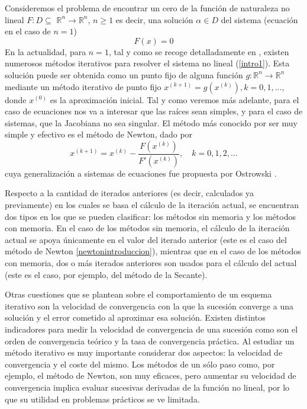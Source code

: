 Consideremos el problema de encontrar un cero de la función de naturaleza no lineal $\displaystyle F : D \subseteq$ $\mathbb{R}^n \to \mathbb{R}^n$, $\displaystyle n\geq 1$ es decir,
una solución $\alpha \in D$ del sistema (ecuación en el caso de $n=1$)
\begin{equation}\label{intro1}
F(x) = 0
\end{equation}
En la actualidad, para $n=1$, tal y como se recoge detalladamente en \cite{PB}, existen numerosos métodos iterativos para resolver el sistema no lineal (\ref{intro1}). Esta solución
puede ser obtenida como un punto fijo de alguna función $g : \mathbb{R}^n \to \mathbb{R}^n$ mediante un método iterativo de punto fijo
$x^{(k+1)} = g(x^{(k)}), k = 0, 1,...$, donde $x^{(0)}$ es la aproximación inicial. Tal y como veremos más adelante, para el caso de ecuaciones nos va a interesar que las raíces sean simples, y para el caso de sistemas, que la Jacobiana no sea singular. El método más conocido por ser muy simple y
efectivo es el método de Newton, dado por
\begin{equation}\label{newtonintroduccion}
	x^{(k+1)}=x^{(k)}-\frac{F(x^{(k)})}{F'(x^{(k)})},\quad k=0,1,2,...
\end{equation}
cuya generalización a sistemas de ecuaciones fue propuesta por Ostrowski \cite{ostrowski}.

Respecto a la cantidad de iterados anteriores (es decir, calculados ya previamente) en los cuales se basa el cálculo de la iteración actual, se encuentran dos tipos en los que se pueden clasificar: los métodos sin memoria y los métodos con memoria. En el caso de los métodos sin memoria, el cálculo de la iteración actual se apoya únicamente en el valor del iterado anterior (este es el caso del método de Newton \eqref{newtonintroduccion}), mientras que en el caso de los métodos con memoria, dos o más iterados anteriores son usados para el cálculo del actual (este es el caso, por ejemplo, del método de la Secante).

Otras cuestiones que se plantean sobre el comportamiento de un esquema iterativo son la velocidad de convergencia
con la que la sucesión converge a una solución y el error cometido al aproximar esa solución. Existen
distintos indicadores para medir la velocidad de convergencia de una sucesión como son el orden de convergencia
teórico y la tasa de convergencia práctica. Al estudiar un método iterativo es muy importante considerar dos
aspectos: la velocidad de convergencia y el coste del mismo. Los métodos de un sólo paso como, por ejemplo,
el método de Newton, son muy eficaces, pero aumentar su velocidad de convergencia implica evaluar sucesivas
derivadas de la función no lineal, por lo que su utilidad en problemas prácticos se ve
limitada.

